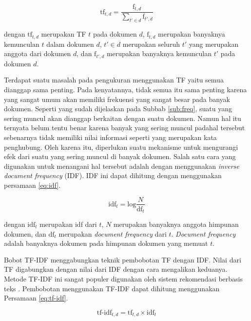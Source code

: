\begin{equation}
	\label{eq:tf}
	\textrm{tf}_{t,d}=\frac{\textrm{f}_{t,d}}{\sum_{t' \in d}\textrm{f}_{t',d}}
\end{equation}

dengan $\textrm{tf}_{t,d}$ merupakan TF \term $t$ pada dokumen $d$, $\textrm{f}_{t,d}$ merupakan banyaknya kemunculan \term $t$ dalam dokumen $d$, $t' \in d$ merupakan seluruh \term $t'$ yang merupakan anggota dari dokumen $d$, dan $\textrm{f}_{t',d}$ merupakan banyaknya kemunculan \term $t'$ pada dokumen $d$.

Terdapat suatu masalah pada pengukuran menggunakan TF yaitu semua \term dianggap sama penting. Pada kenyatannya, tidak semua \term itu sama penting karena \term yang sangat umum akan memiliki frekuensi yang sangat besar pada banyak dokumen. Seperti yang sudah dijelaskan pada Subbab \ref{sub:freq}, suatu \term yang sering muncul akan dianggap berkaitan dengan suatu dokumen. Namun hal itu ternyata belum tentu benar karena banyak \term yang sering muncul padahal \term tersebut sebenarnya tidak memiliki nilai informasi seperti \term yang merupakan kata penghubung. Oleh karena itu, diperlukan suatu mekanisme untuk mengurangi efek dari suatu \term yang sering muncul di banyak dokumen. Salah satu cara yang digunakan untuk menangani hal tersebut adalah dengan menggunakan \textit{inverse document frequency} (IDF). IDF ini dapat dihitung dengan menggunakan persamaan \ref{eq:idf}.

\begin{equation}
	\label{eq:idf}
	\textrm{idf}_t = \textrm{log} \frac{N}{\textrm{df}_t}
\end{equation}

dengan $\textrm{idf}_t$ merupakan idf dari \term $t$, $N$ merupakan banyaknya anggota himpunan dokumen, dan $\textrm{df}_t$ merupakan \textit{document frequency} dari \term $t$. \textit{Document frequency} adalah banyaknya dokumen pada himpunan dokumen yang memuat \term $t$.

Bobot TF-IDF menggabungkan teknik pembobotan TF dengan IDF. Nilai dari TF digabungkan dengan nilai dari IDF dengan cara mengalikan keduanya. Metode TF-IDF ini sangat populer digunakan oleh sistem rekomendasi berbasis teks \cite{aizawa2003information}. Pembobotan menggunakan TF-IDF dapat dihitung menggunakan Persamaan \ref{eq:tf-idf}.

\begin{equation}
	\label{eq:tf-idf}
	\textrm{tf-idf}_{t,d} = \textrm{tf}_{t,d} \times \textrm{idf}_t
\end{equation}

